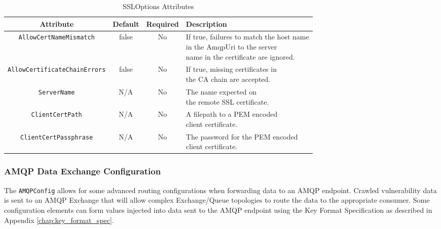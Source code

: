 \begin{table}[h]
    \caption{SSLOptions Attributes}        
    \begin{tabularx}{\textwidth}{cccl}
        \toprule
        \textbf{Attribute} & \textbf{Default} & \textbf{Required} & \textbf{Description}\\
        \midrule
        \texttt{AllowCertNameMismatch} & false & No & \makecell[l]{If true, failures to match the host name\\
        in the AmqpUri to the server\\
        name in the certificate are ignored.}\\
        \midrule
        \texttt{AllowCertificateChainErrors} & false & No & \makecell[l]{If true, missing certificates in\\
        the CA chain are accepted.}\\
        \midrule
        \texttt{ServerName} & N/A & No & \makecell[l]{The name expected on\\
        the remote SSL certificate.}\\
        \midrule
        \texttt{ClientCertPath} & N/A & No & \makecell[l]{A filepath to a PEM encoded\\
        client certificate.}\\
        \midrule
        \texttt{ClientCertPassphrase} & N/A & No & \makecell[l]{The password for the PEM encoded\\
        client certificate.}\\
        \bottomrule
    \end{tabularx}
\end{table}


\subsubsection{AMQP Data Exchange Configuration}

The \texttt{AMQPConfig} allows for some advanced routing configurations when forwarding data to an AMQP endpoint.  Crawled vulnerability
data is sent to an AMQP Exchange that will allow complex Exchange/Queue topologies to route the data to the appropriate consumer.  Some configuration
elements can form values injected into data sent to the AMQP endpoint using the Key Format Specification as described in Appendix \ref{chap:key_format_spec}.







